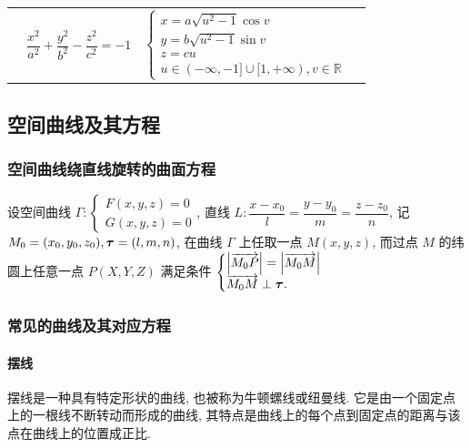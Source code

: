 \begin{table}[H]
{\begin{tabular}{l c | l l}
\begin{minipage}[b]{0.3\columnwidth}
        \end{minipage} & $\dfrac{x^2}{a^2}+\dfrac{y^2}{b^2}-\dfrac{z^2}{c^2}=-1$ & $\begin{cases}
            x=a\sqrt{u^2-1}\cos v\\y=b\sqrt{u^2-1}\sin v\\z=cu\\u\in(-\infty,-1]\cup[1,+\infty),v\in\mathbb{R}
        \end{cases}$
    \end{tabular}
    }
\end{table}

\subsection{空间曲线及其方程}

\subsubsection{空间曲线绕直线旋转的曲面方程}

\begin{theorem}[空间曲线绕直线旋转的曲面方程]
    设空间曲线 $\Gamma:\begin{cases}
        F(x,y,z)=0\\
        G(x,y,z)=0
    \end{cases}$, 直线 $L:\dfrac{x-x_0}{l}=\dfrac{y-y_0}{m}=\dfrac{z-z_0}{n}$, 
    记 $M_0=(x_0,y_0,z_0),\vb*{\tau}=(l,m,n)$, 在曲线 $\Gamma$ 上任取一点 $M(x,y,z)$, 
    而过点 $M$ 的纬圆上任意一点 $P(X,Y,Z)$ 满足条件 $\begin{cases}
        \qty|\overrightarrow{M_0P}|=\qty|\overrightarrow{M_0M}|\\
        \overrightarrow{M_0M}\perp \vb*{\tau}.
    \end{cases}$
\end{theorem}

\subsubsection{常见的曲线及其对应方程}

\paragraph{摆线}

摆线是一种具有特定形状的曲线, 也被称为牛顿螺线或纽曼线. 
它是由一个固定点上的一根线不断转动而形成的曲线, 其特点是曲线上的每个点到固定点的距离与该点在曲线上的位置成正比. 

